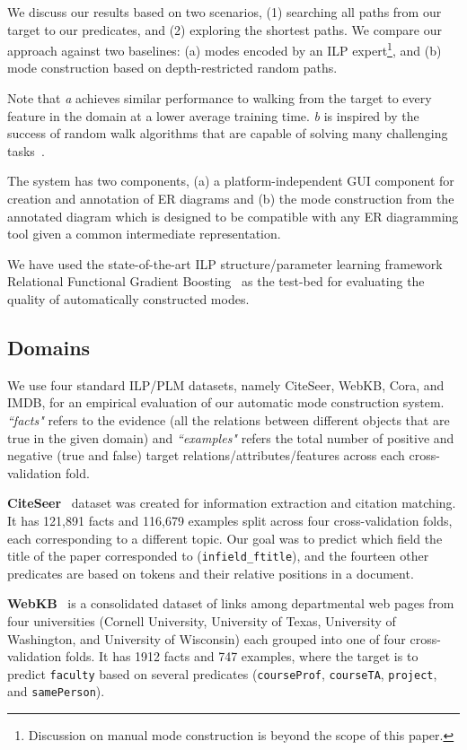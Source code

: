 \documentclass[sigconf]{acmart}
\begin{document}
We discuss our results based on two scenarios, (1) searching all paths from our target to our predicates, and (2) exploring the shortest paths. We compare our approach against two baselines: (a) modes encoded by an ILP expert\footnote{Discussion on manual mode construction is beyond the scope of this paper.},
and (b) mode construction based on depth-restricted random paths. 

Note that \textit{a} achieves similar performance to walking from the target to every feature in the domain at a lower average training time. \textit{b} is inspired by the success of random walk algorithms that are capable of solving many challenging tasks~\cite{PRA}.

The system has two components, (a) a platform-independent GUI component for creation and annotation of ER diagrams and (b) the mode construction from the annotated diagram which is designed to be compatible with any ER diagramming tool given a common intermediate representation.

We have used the state-of-the-art ILP structure/parameter learning framework Relational Functional Gradient Boosting~\cite{natarajan10} as the test-bed for evaluating the quality of automatically constructed modes.

\subsection{Domains}

We use four standard ILP/PLM datasets, namely CiteSeer, WebKB, Cora, and IMDB, for an empirical evaluation of our automatic mode construction system. \textit{``facts"} refers to the evidence (all the relations between different objects that are true in the given domain) and \textit{``examples"} refers the total number of positive and negative (true and false) target relations/attributes/features across each cross-validation fold.

\noindent \textbf{CiteSeer}~\cite{poon07} dataset was created for information extraction and citation matching. It has 121,891 facts and 116,679 examples split across four cross-validation folds, each corresponding to a different topic. Our goal was to predict which field the title of the paper corresponded to (\texttt{infield\_ftitle}), and the fourteen other predicates are based on tokens and their relative positions in a document.

\noindent \textbf{WebKB}~\cite{bottomupmln07} is a consolidated dataset of links among departmental web pages from four universities (Cornell University, University of Texas, University of Washington, and University of Wisconsin) each grouped into one of four cross-validation folds. It has 1912 facts and 747 examples, where the target is to predict \texttt{faculty} based on several predicates (\texttt{courseProf}, \texttt{courseTA}, \texttt{project}, and \texttt{samePerson}).
\end{document}
